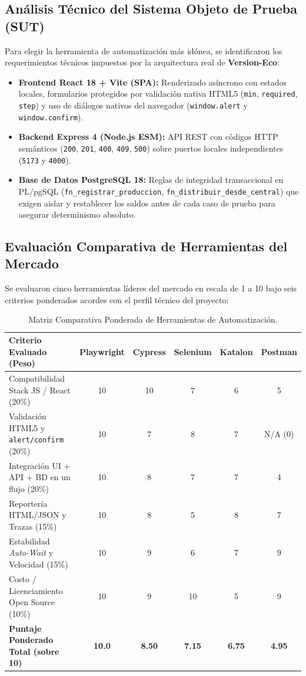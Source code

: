 \documentclass[11pt,a4paper]{article}
\begin{document}
\subsection{Análisis Técnico del Sistema Objeto de Prueba (SUT)}
Para elegir la herramienta de automatización más idónea, se identificaron los requerimientos técnicos impuestos por la arquitectura real de \textbf{Version-Eco}:
\begin{itemize}[noitemsep]
    \item \textbf{Frontend React 18 + Vite (SPA):} Renderizado asíncrono con estados locales, formularios protegidos por validación nativa HTML5 (\texttt{min}, \texttt{required}, \texttt{step}) y uso de diálogos nativos del navegador (\texttt{window.alert} y \texttt{window.confirm}).
    \item \textbf{Backend Express 4 (Node.js ESM):} API REST con códigos HTTP semánticos (\texttt{200}, \texttt{201}, \texttt{400}, \texttt{409}, \texttt{500}) sobre puertos locales independientes (\texttt{5173} y \texttt{4000}).
    \item \textbf{Base de Datos PostgreSQL 18:} Reglas de integridad transaccional en PL/pgSQL (\texttt{fn\_registrar\_produccion}, \texttt{fn\_distribuir\_desde\_central}) que exigen aislar y restablecer los saldos antes de cada caso de prueba para asegurar determinismo absoluto.
\end{itemize}

\subsection{Evaluación Comparativa de Herramientas del Mercado}
Se evaluaron cinco herramientas líderes del mercado en escala de 1 a 10 bajo seis criterios ponderados acordes con el perfil técnico del proyecto:

\begin{table}[htbp]
\centering
\small
\begin{tabularx}{\textwidth}{X c c c c c}
\toprule
\textbf{Criterio Evaluado (Peso)} & \textbf{Playwright} & \textbf{Cypress} & \textbf{Selenium} & \textbf{Katalon} & \textbf{Postman} \\
\midrule
Compatibilidad Stack JS / React (20\%) & 10 & 10 & 7 & 6 & 5 \\
Validación HTML5 y \texttt{alert/confirm} (20\%) & 10 & 7 & 8 & 7 & N/A (0) \\
Integración UI + API + BD en un flujo (20\%) & 10 & 8 & 7 & 7 & 4 \\
Reportería HTML/JSON y Trazas (15\%) & 10 & 8 & 5 & 8 & 7 \\
Estabilidad \textit{Auto-Wait} y Velocidad (15\%) & 10 & 9 & 6 & 7 & 9 \\
Costo / Licenciamiento Open Source (10\%) & 10 & 9 & 10 & 5 & 9 \\
\midrule
\textbf{Puntaje Ponderado Total (sobre 10)} & \textbf{10.0} & \textbf{8.50} & \textbf{7.15} & \textbf{6.75} & \textbf{4.95} \\
\bottomrule
\end{tabularx}
\caption{Matriz Comparativa Ponderada de Herramientas de Automatización.}\label{tab:eval_herramientas}
\end{table}
\end{document}
